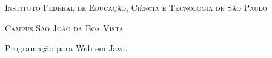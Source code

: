 \begin{titlingpage}
    
    
    \center
    
    \noindent
    \chaptitlefont\large\textsc{Instituto Federal de Educação, Ciência e Tecnologia de São Paulo}
    \vspace{0.5cm}
    
    \noindent    
    \chaptitlefont\large\textsc{Câmpus São João da Boa Vista}
    \vspace{2.5cm}
    
    \noindent
    \chaptitlefont\Large\textsc{\theauthor}
    \vspace{0.5cm}
    \vspace{2.5cm}
    
    \noindent
    \chaptitlefont\HUGE\textsc{\thetitle}
    \vspace{1.5cm}
    
    \hspace{.4\textwidth}
        \begin{flushright}
            \begin{minipage}{.5\textwidth}
                \SingleSpacing
                \large Programação para Web em Java.
            \end{minipage}%
        \end{flushright}
    
    \vspace*{\fill}
        
    \noindent
    \large\textsc{\thedate}
    
    \restoregeometry
    
\end{titlingpage}